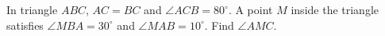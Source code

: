 In triangle \(ABC\), \(AC=BC\) and \(\angle ACB=80^\circ\). A point \(M\) inside the triangle satisfies \(\angle MBA=30^\circ\) and \(\angle MAB=10^\circ\). Find \(\angle AMC\).
